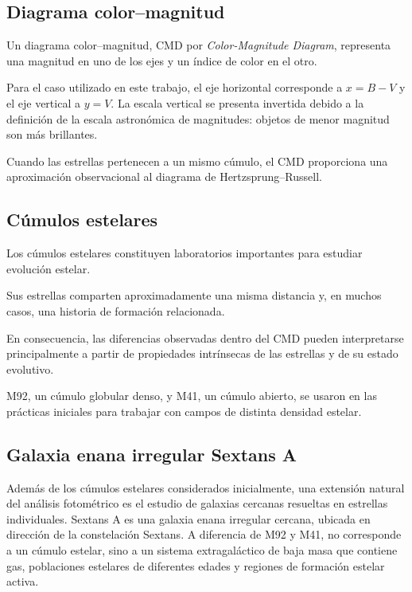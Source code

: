 \documentclass[12pt,letterpaper,oneside]{book}
\begin{document}
\subsection{Diagrama color--magnitud}

Un diagrama color--magnitud, CMD por \textit{Color-Magnitude Diagram}, representa una magnitud en uno de los ejes y un índice de color en el otro.

Para el caso utilizado en este trabajo, el eje horizontal corresponde a $x=B-V$ y el eje vertical a $y=V$. La escala vertical se presenta invertida debido a la definición de la escala astronómica de magnitudes: objetos de menor magnitud son más brillantes.

Cuando las estrellas pertenecen a un mismo cúmulo, el CMD proporciona una aproximación observacional al diagrama de Hertzsprung--Russell.



\subsection{Cúmulos estelares}

Los cúmulos estelares constituyen laboratorios importantes para estudiar evolución estelar.

Sus estrellas comparten aproximadamente una misma distancia y, en muchos casos, una historia de formación relacionada.

En consecuencia, las diferencias observadas dentro del CMD pueden interpretarse principalmente a partir de propiedades intrínsecas de las estrellas y de su estado evolutivo.


M92, un cúmulo globular denso, y M41, un cúmulo abierto, se usaron en las prácticas iniciales para trabajar con campos de distinta densidad estelar.


\subsection{Galaxia enana irregular Sextans A}

Además de los cúmulos estelares considerados inicialmente, una extensión natural del análisis fotométrico es el estudio de galaxias cercanas resueltas en estrellas individuales. Sextans A es una galaxia enana irregular cercana, ubicada en dirección de la constelación Sextans. A diferencia de M92 y M41, no corresponde a un cúmulo estelar, sino a un sistema extragaláctico de baja masa que contiene gas, poblaciones estelares de diferentes edades y regiones de formación estelar activa.
\end{document}
